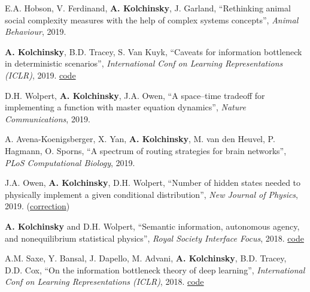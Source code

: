 E.A. Hobson, V. Ferdinand, \textbf{A. Kolchinsky}, J. Garland, ``Rethinking animal social complexity measures with the help of complex systems concepts'', \emph{Animal Behaviour}, 2019.  

\textbf{A. Kolchinsky}, B.D. Tracey, S. Van Kuyk, ``Caveats for information bottleneck in deterministic scenarios'', \emph{International Conf on Learning Representations (ICLR)}, 2019.  \href{https://github.com/artemyk/ibcurve}{code} 

D.H. Wolpert, \textbf{A. Kolchinsky}, J.A. Owen, ``A space–time tradeoff for implementing a function with master equation dynamics'', \emph{Nature Communications}, 2019.  

A. Avena-Koenigsberger, X. Yan, \textbf{A. Kolchinsky}, M. van den Heuvel, P. Hagmann, O. Sporns, ``A spectrum of routing strategies for brain networks'', \emph{PLoS Computational Biology}, 2019. 
 

J.A. Owen, \textbf{A. Kolchinsky}, D.H. Wolpert, ``Number of hidden states needed to physically implement a given conditional distribution'', \emph{New Journal of Physics}, 2019. (\href{https://iopscience.iop.org/article/10.1088/1367-2630/ab60f8}{correction}) 
 

\textbf{A. Kolchinsky} and D.H. Wolpert, ``Semantic information, autonomous agency, and nonequilibrium statistical physics'', \emph{Royal Society Interface Focus}, 2018.  \href{https://github.com/artemyk/semantic_information/}{code} 

A.M. Saxe, Y. Bansal, J. Dapello, M. Advani, \textbf{A. Kolchinsky}, B.D. Tracey, D.D. Cox, ``On the information bottleneck theory of deep learning'', \emph{International Conf on Learning Representations (ICLR)}, 2018.  \href{https://github.com/artemyk/ibsgd/tree/iclr2018}{code} 

